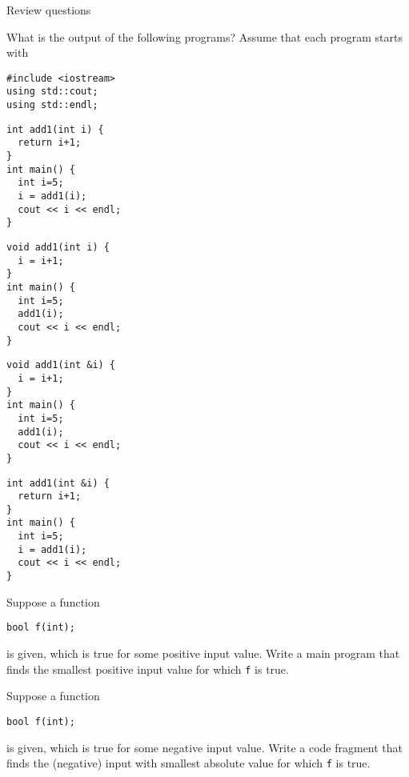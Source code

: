  {Review questions}

\begin{review}
  What is the output of the following programs?
  Assume that each program starts with
\begin{lstlisting}
#include <iostream>
using std::cout;
using std::endl;
\end{lstlisting}

  \begin{multicols}{2}
\begin{lstlisting}
int add1(int i) {
  return i+1;
}
int main() {
  int i=5;
  i = add1(i);
  cout << i << endl;
}
\end{lstlisting}
\columnbreak
\begin{lstlisting}
void add1(int i) {
  i = i+1;
}
int main() {
  int i=5;
  add1(i);
  cout << i << endl;
}
\end{lstlisting}
  \end{multicols}

  \begin{multicols}{2}
\begin{lstlisting}
void add1(int &i) {
  i = i+1;
}
int main() {
  int i=5;
  add1(i);
  cout << i << endl;
}
\end{lstlisting}
\columnbreak
\begin{lstlisting}
int add1(int &i) {
  return i+1;
}
int main() {
  int i=5;
  i = add1(i);
  cout << i << endl;
}
\end{lstlisting}
  \end{multicols}
\end{review}

\begin{review}
  \label{ex:cpp-funcloop1}
  Suppose a function
\begin{lstlisting}
bool f(int);
\end{lstlisting}
is given, which is true for some positive input value. Write a main program that
finds the smallest positive input value for which \lstinline{f} is true.
\end{review}

\begin{review}
  \label{ex:cpp-funcloop2}
  Suppose a function
\begin{lstlisting}
bool f(int);
\end{lstlisting}
is given, which is true for some negative input value. Write a code fragment that
finds the (negative) input with smallest absolute value for which \lstinline{f} is true.
\end{review}

